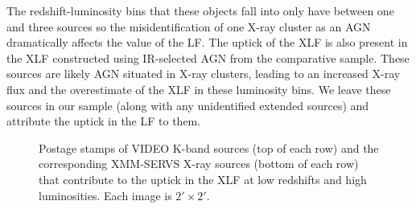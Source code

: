 \documentclass[twocolumn, trackchanges]{aastex63}
\begin{document}
The redshift-luminosity bins that these objects fall into only have between one and three sources so the misidentification of one X-ray cluster as an AGN dramatically affects the value of the LF.
The uptick of the XLF is also present in the XLF constructed using IR-selected AGN from the comparative sample.
These sources are likely AGN situated in X-ray clusters, leading to an increased X-ray flux and the overestimate of the XLF in these luminosity bins.
We leave these sources in our sample (along with any unidentified extended sources) and attribute the uptick in the LF to them. 
\begin{figure}[hptb]
\centering
{}
\vspace{-0.9 cm}
\vspace{-0.9 cm}
\vspace{-0.9 cm}
\caption{Postage stamps of VIDEO K-band sources (top of each row) and the corresponding XMM-SERVS X-ray sources (bottom of each row) that contribute  to the uptick in the XLF at low redshifts and high luminosities. Each image is $2'\times 2'$.}
\label{fig:postagestamps}
\end{figure}
\end{document}
